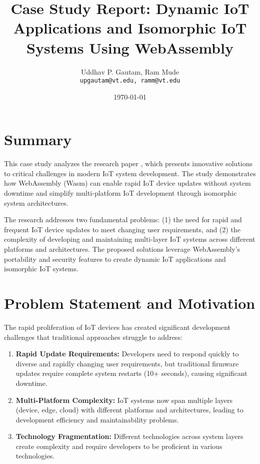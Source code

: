 \documentclass[11pt]{article}
\title{Case Study Report: Dynamic IoT Applications and Isomorphic IoT Systems Using WebAssembly}
\author{Uddhav P. Gautam, Ram Mude\\
\small \texttt{upgautam@vt.edu, ramm@vt.edu}}
\date{\today}
\begin{document}
\maketitle

\singlespacing

\section{Summary}

This case study analyzes the research paper \cite{10539584}, which presents innovative solutions to critical challenges in modern IoT system development. The study demonstrates how WebAssembly (Wasm) can enable rapid IoT device updates without system downtime and simplify multi-platform IoT development through isomorphic system architectures.

The research addresses two fundamental problems: (1) the need for rapid and frequent IoT device updates to meet changing user requirements, and (2) the complexity of developing and maintaining multi-layer IoT systems across different platforms and architectures. The proposed solutions leverage WebAssembly's portability and security features to create dynamic IoT applications and isomorphic IoT systems.

\section{Problem Statement and Motivation}

The rapid proliferation of IoT devices has created significant development challenges \cite{article} that traditional approaches struggle to address:

\begin{enumerate}[label=\arabic*.]
\item \textbf{Rapid Update Requirements:} Developers need to respond quickly to diverse and rapidly changing user requirements, but traditional firmware updates require complete system restarts (10+ seconds), causing significant downtime.

\item \textbf{Multi-Platform Complexity:} IoT systems now span multiple layers (device, edge, cloud) with different platforms and architectures, leading to development efficiency and maintainability problems.

\item \textbf{Technology Fragmentation:} Different technologies across system layers create complexity and require developers to be proficient in various technologies.
\end{enumerate}
\end{document}
